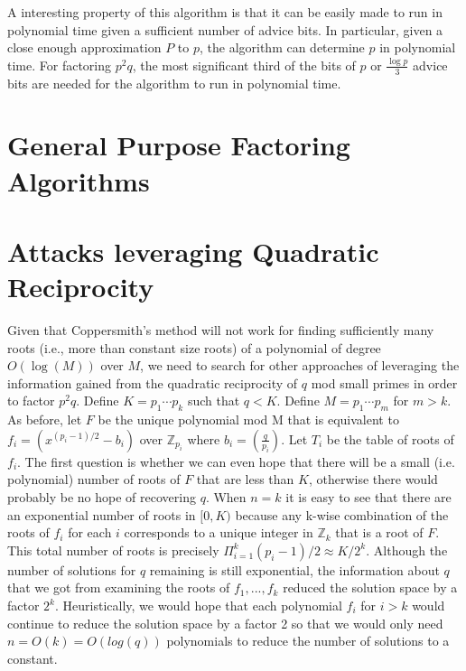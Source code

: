 \documentclass[letterpaper,twocolumn,10pt]{article}
\begin{document}
A interesting property of this algorithm is that it can be easily made to run in polynomial time given a sufficient number of advice bits. In particular, given a close enough approximation $P$ to $p$, the algorithm can determine $p$ in polynomial time. For factoring $p^2 q$, the most significant third of the bits of $p$ or $\frac{\log p}{3}$ advice bits are needed for the algorithm to run in polynomial time.

\section{General Purpose Factoring Algorithms}



\section{Attacks leveraging Quadratic Reciprocity } 
Given that Coppersmith's method will not work for finding sufficiently many roots (i.e., more than constant size roots) of a polynomial of degree $O(\log(M))$ over $M$, we need to search for other approaches of leveraging the information gained from the quadratic reciprocity of $q$ mod small primes in order to factor $p^2 q$. Define $K = p_1 \cdots p_k$ such that $q < K$. Define $M = p_1 \cdots p_m$ for $m > k$. As before, let $F$ be the unique polynomial mod M that is equivalent to $f_i = (x^{(p_i - 1)/2} - b_i)$ over $\mathbb{Z}_{p_i}$ where $b_i =  \left(\frac{q}{p_i}\right)$. Let $T_i$ be the table of roots of $f_i$. The first question is whether we can even hope that there will be a small (i.e. polynomial) number of roots of $F$ that are less than $K$, otherwise there would probably be no hope of recovering $q$. When $n = k$ it is easy to see that there are an exponential number of roots in $[0, K)$ because any k-wise combination of the roots of $f_i$ for each $i$ corresponds to a unique integer in $\mathbb{Z}_k$ that is a root of $F$. This total number of roots is precisely $\Pi_{i= 1}^k (p_i - 1)/2 \approx K/2^k$. Although the number of solutions for $q$ remaining is still exponential, the information about $q$ that we got from examining the roots of $f_1,...,f_k$ reduced the solution space by a factor $2^k$. Heuristically, we would hope that each polynomial $f_i$ for $i > k$ would continue to reduce the solution space by a factor 2 so that we would only need $n = O(k) = O(log(q))$ polynomials to reduce the number of solutions to a constant. 

\end{document}
